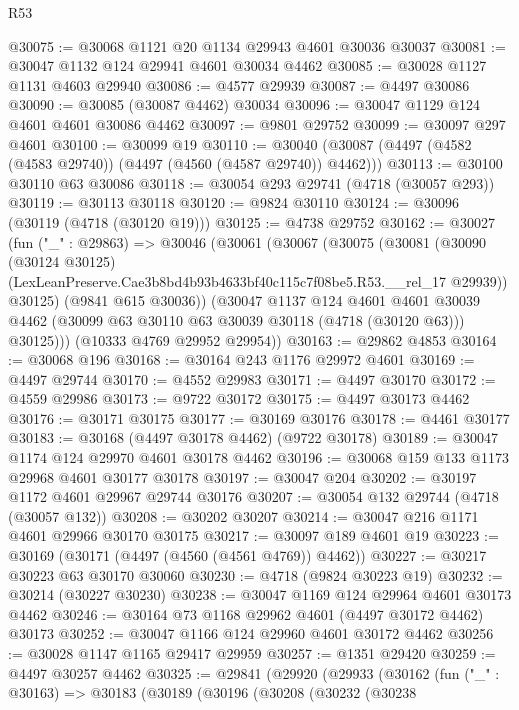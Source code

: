 \begin{lexlean}{R53}
\begin{coremodule}
@30075 := @30068 @1121 @20 @1134 @29943 @4601 @30036 @30037
@30081 := @30047 @1132 @124 @29941 @4601 @30034 @4462
@30085 := @30028 @1127 @1131 @4603 @29940
@30086 := @4577 @29939
@30087 := @4497 @30086
@30090 := @30085 (@30087 @4462) @30034
@30096 := @30047 @1129 @124 @4601 @4601 @30086 @4462
@30097 := @9801 @29752
@30099 := @30097 @297 @4601
@30100 := @30099 @19
@30110 := @30040 (@30087 (@4497 (@4582 (@4583 @29740)) (@4497 (@4560 (@4587 @29740)) @4462)))
@30113 := @30100 @30110 @63 @30086
@30118 := @30054 @293 @29741 (@4718 (@30057 @293))
@30119 := @30113 @30118
@30120 := @9824 @30110
@30124 := @30096 (@30119 (@4718 (@30120 @19)))
@30125 := @4738 @29752
@30162 := @30027
    (fun ("_" : @29863) =>
    @30046
      (@30061
        (@30067
          (@30075
            (@30081
              (@30090
                (@30124 @30125)
                (LexLeanPreserve.Cae3b8bd4b93b4633bf40c115c7f08be5.R53.__rel_17 @29939))
              @30125)
            (@9841 @615 @30036))
          (@30047
            @1137
            @124
            @4601
            @4601
            @30039
            @4462
            (@30099 @63 @30110 @63 @30039 @30118 (@4718 (@30120 @63)))
            @30125)))
      (@10333 @4769 @29952 @29954))
@30163 := @29862 @4853
@30164 := @30068 @196
@30168 := @30164 @243 @1176 @29972 @4601
@30169 := @4497 @29744
@30170 := @4552 @29983
@30171 := @4497 @30170
@30172 := @4559 @29986
@30173 := @9722 @30172
@30175 := @4497 @30173 @4462
@30176 := @30171 @30175
@30177 := @30169 @30176
@30178 := @4461 @30177
@30183 := @30168 (@4497 @30178 @4462) (@9722 @30178)
@30189 := @30047 @1174 @124 @29970 @4601 @30178 @4462
@30196 := @30068 @159 @133 @1173 @29968 @4601 @30177 @30178
@30197 := @30047 @204
@30202 := @30197 @1172 @4601 @29967 @29744 @30176
@30207 := @30054 @132 @29744 (@4718 (@30057 @132))
@30208 := @30202 @30207
@30214 := @30047 @216 @1171 @4601 @29966 @30170 @30175
@30217 := @30097 @189 @4601 @19
@30223 := @30169 (@30171 (@4497 (@4560 (@4561 @4769)) @4462))
@30227 := @30217 @30223 @63 @30170 @30060
@30230 := @4718 (@9824 @30223 @19)
@30232 := @30214 (@30227 @30230)
@30238 := @30047 @1169 @124 @29964 @4601 @30173 @4462
@30246 := @30164 @73 @1168 @29962 @4601 (@4497 @30172 @4462) @30173
@30252 := @30047 @1166 @124 @29960 @4601 @30172 @4462
@30256 := @30028 @1147 @1165 @29417 @29959
@30257 := @1351 @29420
@30259 := @4497 @30257 @4462
@30325 := @29841
    (@29920
      (@29933
        (@30162
          (fun ("_" : @30163) =>
          @30183
            (@30189
              (@30196
                (@30208
                  (@30232
                    (@30238

\end{coremodule}
\end{lexlean}
